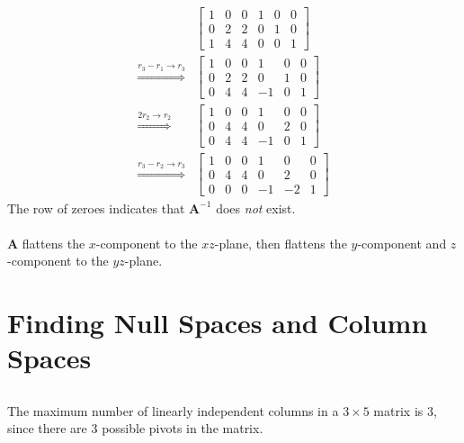 \documentclass[]{article}
\numberwithin{equation}{section}
\begin{document}
\begin{align}
	&\left[
	\begin{array}{ccc|ccc}
	1 & 0 & 0 & 1 & 0 & 0 \\
	0 & 2 & 2 & 0 & 1 & 0 \\
	1 & 4 & 4 & 0 & 0 & 1
	\end{array}
	\right] \\
	\overset{r_3 - r_1 \to r_3}{\Longrightarrow} &\left[
	\begin{array}{ccc|ccc}
	1 & 0 & 0 & 1 & 0 & 0 \\
	0 & 2 & 2 & 0 & 1 & 0 \\
	0 & 4 & 4 & -1 & 0 & 1
	\end{array}
	\right] \\
	\overset{2r_2 \to r_2}{\Longrightarrow} &\left[
	\begin{array}{ccc|ccc}
	1 & 0 & 0 & 1 & 0 & 0 \\
	0 & 4 & 4 & 0 & 2 & 0 \\
	0 & 4 & 4 & -1 & 0 & 1
	\end{array}
	\right] \\
	\overset{r_3 - r_2 \to r_3}{\Longrightarrow} &\left[
	\begin{array}{ccc|ccc}
	1 & 0 & 0 & 1 & 0 & 0 \\
	0 & 4 & 4 & 0 & 2 & 0 \\
	0 & 0 & 0 & -1 & -2 & 1
	\end{array}
	\right]
\end{align}
The row of zeroes indicates that \(\mathbf{A}^{-1}\) does \emph{not} exist. \\
\\
\(\mathbf{A}\) flattens the \(x\)-component to the \(xz\)-plane, then flattens the \(y\)-component and \(z\)-component to the \(yz\)-plane. 

\section{Finding Null Spaces and Column Spaces}

\subsection{}

The maximum number of linearly independent columns in a \(3 \times 5\) matrix is 3, since there are 3 possible pivots in the matrix. 

\subsection{}
\end{document}
